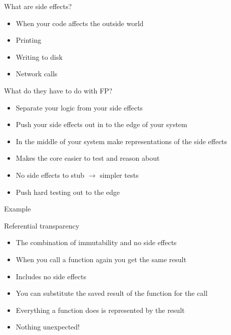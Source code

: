 \documentclass[aspectratio=169]{beamer}
\begin{document}
\begin{frame}
  \begin{center}
    \Huge What are side effects?
  \end{center}
  \begin{itemize}
    \item When your code affects the outside world
    \item Printing
    \item Writing to disk
    \item Network calls
  \end{itemize}
\end{frame}

\begin{frame}
  \begin{center}
    \Huge What do they have to do with FP?
  \end{center}
  \begin{itemize}
    \item Separate your logic from your side effects
    \item Push your side effects out in to the edge of your system
    \item In the middle of your system make representations of the side effects
    \item Makes the core easier to test and reason about
    \item No side effects to stub $\rightarrow$ simpler tests
    \item Push hard testing out to the edge
  \end{itemize}
\end{frame}

\begin{frame}
  \begin{center}
    \Huge Example
  \end{center}
\end{frame}

\begin{frame}
  \begin{center}
    \Huge Referential transparency
  \end{center}
  \begin{itemize}
    \item The combination of immutability and no side effects
    \item When you call a function again you get the same result
    \item Includes no side effects
    \item You can substitute the saved result of the function for the call
    \item Everything a function does is represented by the result
    \item Nothing unexpected!
  \end{itemize}
\end{frame}
\end{document}

